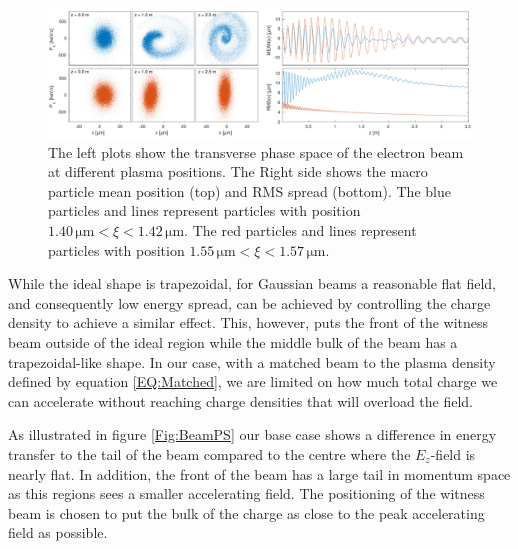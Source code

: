 \documentclass[aps,prstab,reprint,amsmath,amssymb,groupedaddress]{revtex4-1}
\newcommand{\unit}[1]{\,\mathrm{#1}}
\begin{document}
\begin{figure}[hbt]
    \includegraphics[width=\linewidth,trim={0mm 0mm 0mm 0mm},clip]{figures/beamFilamentationAll}
    \caption{\label{Fig:BeamFilament} The left plots show the transverse phase space of the electron beam at different
        plasma positions. The Right side shows the macro particle mean position (top) and RMS spread (bottom). The blue
        particles and lines represent particles with position $1.40\unit{\mu m} < \xi < 1.42\unit{\mu m}$. The red
        particles and lines represent particles with position $1.55\unit{\mu m} < \xi < 1.57\unit{\mu m}$.}
\end{figure}

While the ideal shape is trapezoidal, for Gaussian beams a reasonable flat field, and consequently low energy spread,
can be achieved by controlling the charge density to achieve a similar effect. This, however, puts the front of the
witness beam outside of the ideal region while the middle bulk of the beam has a trapezoidal-like shape. In our case,
with a matched beam to the plasma density defined by equation \ref{EQ:Matched}, we are limited on how much total charge
we can accelerate without reaching charge densities that will overload the field.

As illustrated in figure \ref{Fig:BeamPS} our base case shows a difference in energy transfer to the tail of the beam
compared to the centre where the $E_{z}$-field is nearly flat. In addition, the front of the beam has a large tail in
momentum space as this regions sees a smaller accelerating field. The positioning of the witness beam is chosen to put
the bulk of the charge as close to the peak accelerating field as possible.
\end{document}
